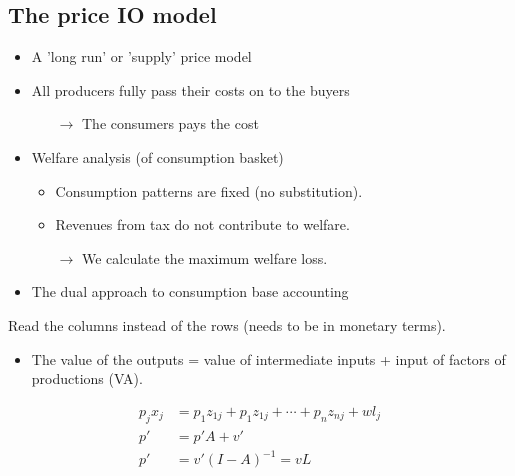 \begin{multicols}{2}
\subsection{The price IO model}
\begin{itemize}
  \item A 'long run' or 'supply' price model
  \item All producers fully pass their costs on to the buyers
  \begin{itemize}
    \item[$\rightarrow$] The consumers pays the cost
  \end{itemize}
  \item Welfare analysis (of consumption basket)
  \begin{itemize}
    \item Consumption patterns are fixed (no substitution).
    \item Revenues from tax do not contribute to welfare.
    \item[$\rightarrow$] We calculate the maximum welfare loss.
  \end{itemize}
  \item The dual approach to consumption base accounting
\end{itemize}
Read the columns instead of the rows (needs to be in monetary terms).
\begin{itemize}
  \item The value of the outputs = value of intermediate inputs + input of factors of productions (VA).
\end{itemize}
\begin{align*}
  p_jx_j&=p_1z_{1j}+p_1z_{1j}+\cdots +p_nz_{nj}+wl_j\\
  p'&=p'A+v'\\
  p'&=v'(I-A)^{-1}=vL
\end{align*}


\end{multicols}
